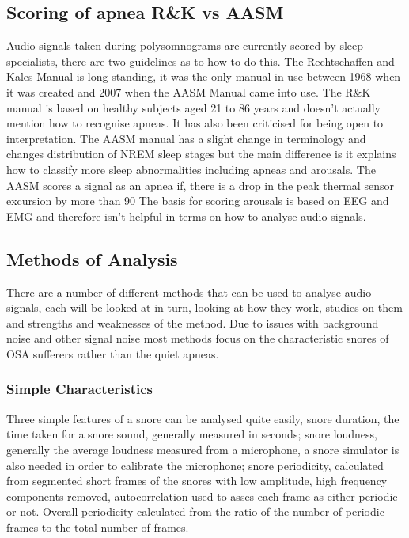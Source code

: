 \subsection{Scoring of apnea R\&K vs AASM}
Audio signals taken during polysomnograms are currently scored by sleep specialists, there are two guidelines as to how to do this. The Rechtschaffen and Kales Manual is long standing, it was the only manual in use between 1968 when it was created and 2007 when the AASM Manual came into use. 
The R\&K manual is based on healthy subjects aged 21 to 86 years and doesn’t actually mention how to recognise apneas. It has also been criticised for being open to interpretation. The AASM manual has a slight change in terminology and changes distribution of NREM sleep stages but the main difference is it explains how to classify more sleep abnormalities including apneas and arousals. 
The AASM scores a signal as an apnea if, there is a drop in the peak thermal sensor excursion by more than 90%
The basis for scoring arousals is based on EEG and EMG and therefore isn’t helpful in terms on how to analyse audio signals. 

\subsection{Methods of Analysis}
There are a number of different methods that can be used to analyse audio signals, each will be looked at in turn, looking at how they work, studies on them and strengths and weaknesses of the method. Due to issues with background noise and other signal noise most methods focus on the characteristic snores of OSA sufferers rather than the quiet apneas. 

\subsubsection{Simple Characteristics}
Three simple features of a snore can be analysed quite easily, snore duration, the time taken for a snore sound, generally measured in seconds; snore loudness, generally the average loudness measured from a microphone, a snore simulator is also needed in order to calibrate the microphone; snore periodicity, calculated from segmented short frames of the snores with low amplitude, high frequency components removed, autocorrelation used to asses each frame as either periodic or not. Overall periodicity calculated from the ratio of the number of periodic frames to the total number of frames.

